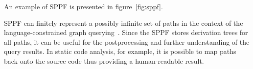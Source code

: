 An example of SPPF is presented in figure~\ref{fig:sppf}.

SPPF can finitely represent a possibly infinite set of paths in the context of the language-constrained graph querying~\cite{Grigorev16}.
Since the SPPF stores derivation trees for all paths, it can be useful for the postprocessing and further understanding of the query results. 
In static code analysis, for example, it is possible to map paths back onto the source code thus providing a human-readable result.


